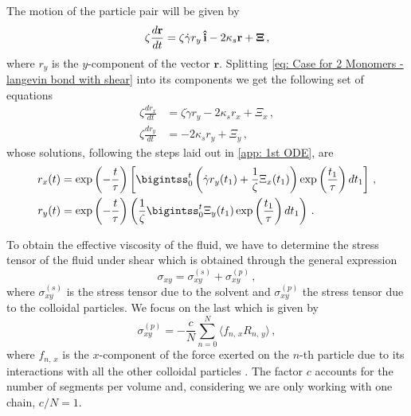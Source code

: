 \documentclass[../../main.tex]{subfiles}
\begin{document}
    The motion of the particle pair will be given by
        \begin{equation}\label{eq: Case for 2 Monomers - langevin bond with shear}
            \zeta \frac{d\mathbf{r}}{dt} = \zeta \Dot{\gamma} r_y \,\uvec{i} -2\kappa_s\mathbf{r} + \bm{\Xi} \,,
        \end{equation}
    where $r_y$ is the $y$-component of the vector $\mathbf{r}$. Splitting \cref{eq: Case for 2 Monomers - langevin bond with shear} into its components we get the following set of equations
        \begin{equation}\label{eq: Case for 2 Monomers - langevin bond with shear (components)}
            \begin{split}
                \zeta \frac{dr_x}{dt} &= \zeta \Dot{\gamma} r_y -2\kappa_s r_x + \Xi_x \,, \\
                \zeta \frac{dr_y}{dt} &= -2\kappa_s r_y + \Xi_y \,,
            \end{split}
        \end{equation}
    whose solutions, following the steps laid out in \cref{app: 1st ODE}, are
        \begin{equation}\label{eq: Case for 2 Monomers - langevin bond with shear solution}
            \begin{split}
                r_x(t) &= \exp\left(-\frac{t}{\tau}\right) \left[ \bigintss_0^t \left( \Dot{\gamma}r_y(t_1) + \frac{1}{\zeta}\Xi_x(t_1) \right) \exp\left(\frac{t_1}{\tau} \right) dt_1 \right] \,, \\
                r_y(t) &= \exp\left(-\frac{t}{\tau}\right) \left( \frac{1}{\zeta} \bigintss_0^t \Xi_y(t_1) \exp\left(\frac{t_1}{\tau} \right) dt_1 \right) \,.
            \end{split}
        \end{equation}
    
    To obtain the effective viscosity of the fluid, we have to determine the stress tensor of the fluid under shear which is obtained through the general expression
        \begin{equation}
            \sigma_{xy} = \sigma^{(s)}_{xy} + \sigma^{(p)}_{xy} \,,
        \end{equation}
    where $\sigma^{(s)}_{xy}$ is the stress tensor due to the solvent and $\sigma^{(p)}_{xy}$ the stress tensor due to the colloidal particles. We focus on the last which is given by
        \begin{equation}\label{eq: Viscoelasticity - stress tensor due to solvent}
            \sigma^{(p)}_{xy} = -\frac{c}{N} \sum_{n=0}^N \langle f_{n,\,x} R_{n, \,y} \rangle \,,
        \end{equation}
    where $f_{n,\,x}$ is the $x$-component of the force exerted on the $n$-th particle due to its interactions with all the other colloidal particles \cite{doiTheoryPolymerDynamics1988}. The factor $c$ accounts for the number of segments per volume and, considering we are only working with one chain, $c/N = 1$. 
    
\end{document}

